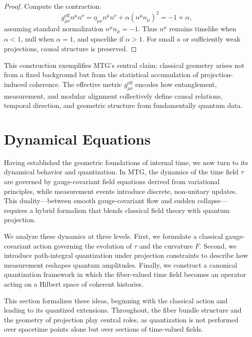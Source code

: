 \documentclass[11pt]{article}
\begin{document}
\begin{proof}
Compute the contraction:
\[
g^{\mathrm{eff}}_{\mu\nu} n^\mu n^\nu = \eta_{\mu\nu} n^\mu n^\nu + \alpha (n^\mu n_\mu)^2 = -1 + \alpha,
\]
assuming standard normalization \( n^\mu n_\mu = -1 \). Thus \( n^\mu \) remains timelike when \( \alpha < 1 \), null when \( \alpha = 1 \), and spacelike if \( \alpha > 1 \). For small \( \kappa \) or sufficiently weak projections, causal structure is preserved.
\end{proof}

This construction exemplifies MTG’s central claim: classical geometry arises not from a fixed background but from the statistical accumulation of projection-induced coherence. The effective metric \( g^{\mathrm{eff}}_{\mu\nu} \) encodes how entanglement, measurement, and modular alignment collectively define causal relations, temporal direction, and geometric structure from fundamentally quantum data.



\section{Dynamical Equations}\label{sec:3}
Having established the geometric foundations of internal time, we now turn to its dynamical behavior and quantization. In MTG, the dynamics of the time field \( \tau \) are governed by gauge-covariant field equations derived from variational principles, while measurement events introduce discrete, non-unitary updates. This duality—between smooth gauge-covariant flow and sudden collapse—requires a hybrid formalism that blends classical field theory with quantum projection.

We analyze these dynamics at three levels. First, we formulate a classical gauge-covariant action governing the evolution of \( \tau \) and the curvature \( F \). Second, we introduce path-integral quantization under projection constraints to describe how measurement reshapes quantum amplitudes. Finally, we construct a canonical quantization framework in which the fiber-valued time field becomes an operator acting on a Hilbert space of coherent histories.

This section formalizes these ideas, beginning with the classical action and leading to its quantized extensions. Throughout, the fiber bundle structure and the geometry of projection play central roles, as quantization is not performed over spacetime points alone but over sections of time-valued fields.
\end{document}
